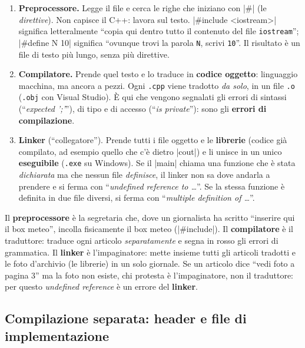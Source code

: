 \begin{enumerate}
  \item \textbf{Preprocessore.} Legge il file e cerca le righe che iniziano con
        \cc|#| (le \emph{direttive}). Non capisce il C++: lavora sul testo.
        \cc|#include <iostream>| significa letteralmente ``copia qui dentro tutto
        il contenuto del file \texttt{iostream}''; \cc|#define N 10| significa
        ``ovunque trovi la parola \texttt{N}, scrivi \texttt{10}''.
        Il risultato è un file di testo più lungo, senza più direttive.
  \item \textbf{Compilatore.} Prende quel testo e lo traduce in
        \textbf{codice oggetto}: linguaggio macchina, ma ancora a pezzi. Ogni
        \texttt{.cpp} viene tradotto \emph{da solo}, in un file \texttt{.o}
        (\texttt{.obj} con Visual Studio). È qui che vengono segnalati gli
        errori di sintassi (``\emph{expected ';'}''), di tipo e di accesso
        (``\emph{is private}''): sono gli \textbf{errori di compilazione}.
  \item \textbf{Linker} (``collegatore''). Prende tutti i file oggetto e le
        \textbf{librerie} (codice già compilato, ad esempio quello che c'è
        dietro \cc|cout|) e li unisce in un unico \textbf{eseguibile}
        (\texttt{.exe} su Windows). Se il \cc|main| chiama una funzione che è
        stata \emph{dichiarata} ma che nessun file \emph{definisce}, il linker non
        sa dove andarla a prendere e si ferma con
        ``\emph{undefined reference to \ldots}''. Se la stessa funzione è definita
        in due file diversi, si ferma con ``\emph{multiple definition of \ldots}''.
\end{enumerate}

\begin{analogia}
Il \textbf{preprocessore} è la segretaria che, dove un giornalista ha scritto
``inserire qui il box meteo'', incolla fisicamente il box meteo
(\cc|#include|). Il \textbf{compilatore} è il traduttore: traduce ogni articolo
\emph{separatamente} e segna in rosso gli errori di grammatica. Il
\textbf{linker} è l'impaginatore: mette insieme tutti gli articoli tradotti e le
foto d'archivio (le librerie) in un solo giornale. Se un articolo dice ``vedi
foto a pagina 3'' ma la foto non esiste, chi protesta è l'impaginatore, non il
traduttore: per questo \emph{undefined reference} è un errore del \textbf{linker}.
\end{analogia}

\subsection*{Compilazione separata: header e file di implementazione}

